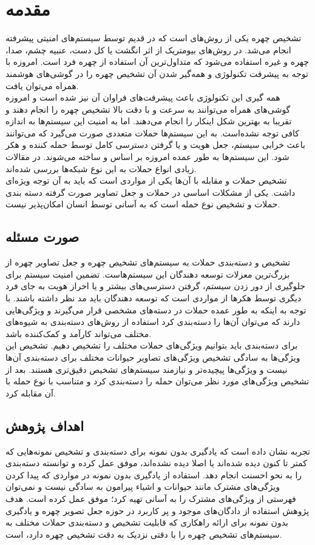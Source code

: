 \chapter{مقدمه}
\label{chap:introduction}
تشخیص چهره یکی از روش‌های
است که در قدیم توسط سیستم‌های امنیتی پیشرفته انجام می‌شد. در روش‌های بیومتریک از اثر انگشت یا کل دست، عنبیه چشم، صدا، چهره و غیره استفاده می‌شود که متداول‌ترین آن استفاده از چهره فرد است. امروزه با توجه به پیشرفت تکنولوژی و همه‌گیر شدن آن تشخیص چهره را در گوشی‌های هوشمند همراه می‌توان یافت.
\\
همه گیری این تکنولوژی باعث پیشرفت‌های فراوان آن نیز شده است و امروزه گوشی‌های همراه می‌توانند به سرعت و با دقت بالا تشخیص چهره را انجام دهند و تقریبا به بهترین شکل اینکار را انجام می‌دهند. اما به امنیت این سیستم‌ها به اندازه کافی توجه نشده‌است. به این سیستم‌ها حملات متعددی صورت می‌گیرد که می‌توانند باعث خرابی سیستم، جعل هویت و یا گرفتن دسترسی کامل توسط حمله کننده و هکر شود. این سیستم‌ها به طور عمده امروزه بر اساس
و
ساخته می‌شوند. در مقالات زیادی انواع حملات به این نوع شبکه‌ها بررسی شده‌اند.
\\
تشخیص حملات و مقابله با آن‌ها یکی از مواردی است که باید به آن توجه ویژه‌ای داشت. یکی از مشکلات اساسی در حملات و جعل تصاویر صورت گرفته دسته بندی حملات و تشخیص نوع حمله است که به آسانی توسط انسان امکان‌پذیر نیست.
\section{صورت مسئله}
تشخیص و دسته‌بندی حملات به سیستم‌های تشخیص چهره و جعل‌ تصاویر چهره از بزرگ‌ترین معزلات توسعه دهندگان این سیستم‌هاست. تضمین امنیت سیستم برای جلوگیری از دور زدن سیستم، گرفتن دسترسی‌های بیشتر و یا احراز هویت به جای فرد دیگری توسط هکرها از مواردی است که  توسعه دهندگان باید مد نظر داشته باشند. با توجه به اینکه به طور عمده حملات در دسته‌های مشخصی قرار می‌گیرند و ویژگی‌هایی دارند که می‌توان آن‌ها را دسته‌بندی کرد استفاده از روش‌های دسته‌بندی به شیوه‌های مختلف می‌تواند کارآمد و کمک‌کننده باشد.
\\
برای دسته‌بندی باید بتوانیم ویژگی‌های حملات مختلف را تشخیص دهیم. تشخیص این ویژگی‌ها به سادگی تشخیص ویژگی‌های تصاویر حیوانات مختلف برای دسته‌بندی آن‌ها نیست و ویژگی‌ها پیچیده‌تر و نیازمند سیستم‌های تشخیص دقیق‌تری هستند. بعد از تشخیص ویژگی‌های مورد نظر می‌توان حمله را دسته‌بندی کرد و متناسب با نوع حمله با آن مقابله کرد.

\section{اهداف پژوهش}
تجربه نشان داده است که یادگیری بدون نمونه برای دسته‌بندی و تشخیص نمونه‌هایی که کمتر تا کنون دیده شده‌اند یا اصلا دیده نشده‌اند، موفق عمل کرده و توانسته دسته‌بندی را به نحو احسنت انجام دهد. استفاده از یادگیری بدون نمونه در مواردی که پیدا کردن ویژگی‌های مشترک مانند حیوانات و اشیاء پیرامون به سادگی نیست و نمی‌توان فهرستی از ویژگی‌های مشترک را به آسانی تهیه کرد؛ موفق عمل کرده است. هدف پژوهش استفاده از دادگان‌های موجود و پر کاربرد در حوزه جعل تصویر چهره و یادگیری بدون نمونه برای ارائه راهکاری که قابلیت تشخیص و دسته‌بندی حملات مختلف به سیستم‌های تشخیص چهره را با دقتی نزدیک به دقت تشخیص چهره دارد، است.

